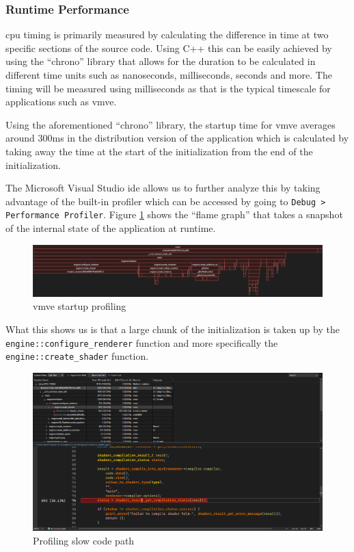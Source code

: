 \documentclass[11pt]{article}
\begin{document}
\subsubsection{Runtime Performance}
\gls*{cpu} timing is primarily measured by calculating the difference in time at
two specific sections of the source code. Using C++ this can be easily achieved
by using the ``chrono'' library that allows for the duration to be calculated in
different time units such as nanoseconds, milliseconds, seconds and more. The
timing will be measured using milliseconds as that is the typical timescale for
applications such as \gls*{vmve}.

Using the aforementioned ``chrono'' library, the startup time for \gls*{vmve}
averages around 300ms in the distribution version of the application which is
calculated by taking away the time at the start of the initialization from the
end of the initialization.

The Microsoft Visual Studio \gls*{ide} allows us to further analyze this by
taking advantage of the built-in profiler which can be accessed by going to
\lstinline{Debug > Performance Profiler}. Figure
\ref{fig:vmve_startup_profiling} shows the ``flame graph'' that takes a snapshot
of the internal state of the application at runtime.

\begin{figure}[H]
  \centering
  \includegraphics[width=\textwidth]{images/startup_profiling_graph.png}
  \caption{\gls*{vmve} startup profiling}
  \label{fig:vmve_startup_profiling}
\end{figure}

What this shows us is that a large chunk of the initialization is taken up by
the \lstinline{engine::configure_renderer} function and more specifically the
\lstinline{engine::create_shader} function.

\begin{figure}[H]
  \centering
  \includegraphics[width=\textwidth]{images/startup_profiling_slow_shader_compile.png}
  \caption{Profiling slow code path}
  \label{fig:vmve_slow_code_path}
\end{figure}
\end{document}
